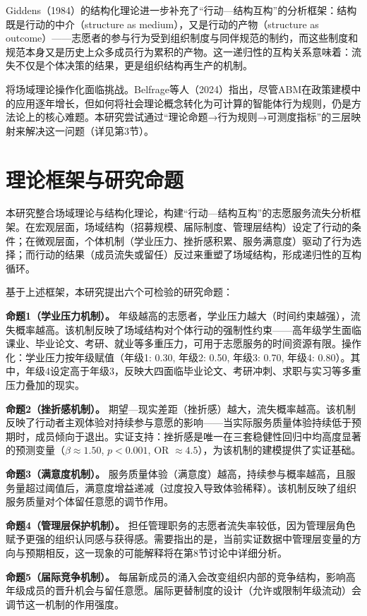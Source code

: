 \documentclass[12pt,a4paper]{article}
\begin{document}
Giddens（1984）的结构化理论进一步补充了“行动—结构互构”的分析框架：结构既是行动的中介（structure as medium），又是行动的产物（structure as outcome）——志愿者的参与行为受到组织制度与同伴规范的制约，而这些制度和规范本身又是历史上众多成员行为累积的产物。这一递归性的互构关系意味着：流失不仅是个体决策的结果，更是组织结构再生产的机制。

将场域理论操作化面临挑战。Belfrage等人（2024）指出，尽管ABM在政策建模中的应用逐年增长，但如何将社会理论概念转化为可计算的智能体行为规则，仍是方法论上的核心难题。本研究尝试通过“理论命题→行为规则→可测度指标”的三层映射来解决这一问题（详见第3节）。

\section{理论框架与研究命题}

本研究整合场域理论与结构化理论，构建“行动—结构互构”的志愿服务流失分析框架。在宏观层面，场域结构（招募规模、届际制度、管理层结构）设定了行动的条件；在微观层面，个体机制（学业压力、挫折感积累、服务满意度）驱动了行为选择；而行动的结果（成员流失或留任）反过来重塑了场域结构，形成递归性的互构循环。

基于上述框架，本研究提出六个可检验的研究命题：

\textbf{命题1（学业压力机制）。} 年级越高的志愿者，学业压力越大（时间约束越强），流失概率越高。该机制反映了场域结构对个体行动的强制性约束——高年级学生面临课业、毕业论文、考研、就业等多重压力，可用于志愿服务的时间资源有限。操作化：学业压力按年级赋值（年级1: 0.30, 年级2: 0.50, 年级3: 0.70, 年级4: 0.80）。其中，年级4设定高于年级3，反映大四面临毕业论文、考研冲刺、求职与实习等多重压力叠加的现实。

\textbf{命题2（挫折感机制）。} 期望—现实差距（挫折感）越大，流失概率越高。该机制反映了行动者主观体验对持续参与意愿的影响——当实际服务质量体验持续低于预期时，成员倾向于退出。实证支持：挫折感是唯一在三套稳健性回归中均高度显著的预测变量（$\beta \approx 1.50$, $p < 0.001$, OR $\approx 4.5$），为该机制的建模提供了实证基础。

\textbf{命题3（满意度机制）。} 服务质量体验（满意度）越高，持续参与概率越高，且服务量超过阈值后，满意度增益递减（过度投入导致体验稀释）。该机制反映了组织服务质量对个体留任意愿的调节作用。

\textbf{命题4（管理层保护机制）。} 担任管理职务的志愿者流失率较低，因为管理层角色赋予更强的组织认同感与获得感。需要指出的是，当前实证数据中管理层变量的方向与预期相反，这一现象的可能解释将在第8节讨论中详细分析。

\textbf{命题5（届际竞争机制）。} 每届新成员的涌入会改变组织内部的竞争结构，影响高年级成员的晋升机会与留任意愿。届际更替制度的设计（允许或限制年级流动）会调节这一机制的作用强度。
\end{document}

